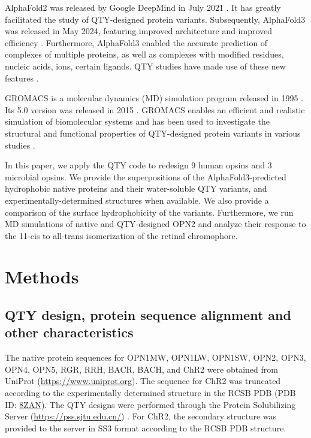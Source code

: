 \documentclass[fleqn, 10pt]{manuscript}
\begin{document}
AlphaFold2 was released by Google DeepMind in July 2021 \citep{Jumper_2021}. It has greatly facilitated the study of QTY-designed protein variants. Subsequently, AlphaFold3 was released in May 2024, featuring improved architecture and improved efficiency \citep{Abramson_2024}. Furthermore, AlphaFold3 enabled the accurate prediction of complexes of multiple proteins, as well as complexes with modified residues, nucleic acids, ions, certain ligands. QTY studies have made use of these new features \citep{Chen_2025, Johnsson_2025}. 

GROMACS is a molecular dynamics (MD) simulation program released in 1995 \citep{Berendsen_1995}. Its 5.0 version was released in 2015 \citep{Abraham_2015}. GROMACS enables an efficient and realistic simulation of biomolecular systems and has been used to investigate the structural and functional properties of QTY-designed protein variants in various studies \citep{Karagol_2024, Li_Tang_2024, Smorodina_2024, Li_Wang_2024, Johnsson_2025}. 

In this paper, we apply the QTY code to redesign 9 human opsins and 3 microbial opsins. We provide the superpositions of the AlphaFold3-predicted hydrophobic native proteins and their water-soluble QTY variants, and experimentally-determined structures when available. We also provide a comparison of the surface hydrophobicity of the variants. Furthermore, we run MD simulations of native and QTY-designed OPN2 and analyze their response to the 11-cis to all-trans isomerization of the retinal chromophore. 

\section*{Methods}

\subsection*{QTY design, protein sequence alignment and other characteristics}

The native protein sequences for OPN1MW, OPN1LW, OPN1SW, OPN2, OPN3, OPN4, OPN5, RGR, RRH, BACR, BACH, and ChR2 were obtained from UniProt (\url{https://www.uniprot.org}). The sequence for ChR2 was truncated according to the experimentally determined structure in the RCSB PDB (PDB ID: \href{https://www.rcsb.org/structure/8ZAN}{8ZAN}). The QTY designs were performed through the Protein Solubilizing Server (\url{https://pss.sjtu.edu.cn/}) \citep{Tao_2022}. For ChR2, the secondary structure was provided to the server in SS3 format according to the RCSB PDB structure. 
\end{document}
